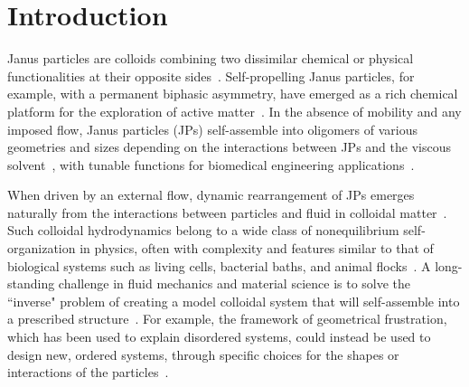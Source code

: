 \documentclass[prb,preprint,showpacs,preprintnumbers,amsmath,amssymb,longbibliography]{revtex4-1}
\begin{document}
\section{Introduction}
Janus particles are colloids combining two dissimilar chemical or
physical functionalities at their opposite
sides~\cite{KirillovaMarschelkeSynytska2019}. Self-propelling Janus
particles, for example, with a permanent biphasic asymmetry, have
emerged as a rich chemical platform for the exploration of active
matter~\cite{Meredithetal2022}.
In the absence of mobility and any
imposed flow, Janus particles (JPs) self-assemble
into oligomers of various geometries
and sizes
depending on the interactions between JPs and the 
viscous solvent~\cite{Bradley2017, KangHonciuc2018,
HongCacciutoLuijtenGranick2008},
with tunable functions for biomedical engineering
applications~\cite{GheisariSahfieeAbbasiEtAl2021_DMR,
LiuYangHuangEtAl2016_Angew, LiWangYaoEtAl2019_Nanoscale,
Bradley2016,Zarzaretal2015, KirillovaMarschelkeSynytska2019}.


When driven by an external flow, dynamic rearrangement of JPs emerges
naturally from the interactions between particles and fluid in colloidal
matter~\cite{RevModPhys.93.025008}. Such colloidal hydrodynamics
belong to a wide class of nonequilibrium self-organization in physics,
often with complexity and features similar to that of biological systems
such as living cells, bacterial baths, and animal
flocks~\cite{CollardGrosjeanVandewalle2020, Vutukuri2020}. A
long-standing challenge in fluid mechanics and material science is to
solve the ``inverse" problem of creating a model colloidal system that
will self-assemble into a prescribed
structure~\cite{PhysRevLett.128.256102}. For example, the framework of
geometrical frustration, which has been used to explain disordered
systems, could instead be used to design new, ordered systems, through
specific choices for the shapes or interactions of the
particles~\cite{Manoharan2015_Science}.
\end{document}

